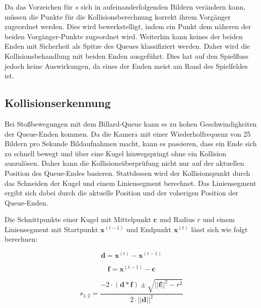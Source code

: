 Da das Vorzeichen für $s$ sich in aufeinanderfolgenden Bildern verändern kann, müssen die Punkte für die Kollisionsberechnung korrekt ihrem Vorgänger zugeordnet werden.
Dies wird bewerkstelligt, indem ein Punkt dem näheren der beiden Vorgänger-Punkte zugeordnet wird.
Weiterhin kann keines der beiden Enden mit Sicherheit als Spitze des Queues klassifiziert werden.
Daher wird die Kollisionsbehandlung mit beiden Enden ausgeführt.
Dies hat auf den Spielfluss jedoch keine Auswirkungen, da eines der Enden meist am Rand des Spielfeldes ist.

\subsection{Kollisionserkennung}

Bei Stoßbewegungen mit dem Billard-Queue kann es zu hohen Geschwindigkeiten der Queue-Enden kommen. 
Da die Kamera mit einer Wiederholfrequenz von 25 Bildern pro Sekunde Bildaufnahmen macht, kann es passieren, dass ein Ende sich zu schnell bewegt und über eine Kugel hinwegspringt ohne ein Kollision auszulösen. 
Daher kann die Kollisionsüberprüfung nicht nur auf der aktuellen Position des Queue-Endes basieren.
Stattdessen wird der Kollisionspunkt durch das Schneiden der Kugel und einem  Liniensegment berechnet. 
Das Liniensegment ergibt sich dabei durch die aktuelle Position und der voherigen Position der Queue-Enden.

Die Schnittpunkte einer Kugel mit Mittelpunkt $\textbf{c}$ und Radius $r$ und einem Liniensegment mit Startpunkt  $\textbf{x}^{(t-1)}$ und Endpunkt $\textbf{x}^{(t)}$ lässt sich wie folgt berechnen:

\hspace{-1cm}\begin{minipage}{.333333\linewidth}
	\begin{equation*}
	\textbf{d} = \textbf{x}^{(t)} - \textbf{x}^{(t-1)}
	\end{equation*}
\end{minipage}%
\begin{minipage}{.333333\linewidth}
	\begin{equation*}
	\textbf{f} = \textbf{x}^{(t-1)} - \textbf{c}
	\end{equation*}
\end{minipage}
\begin{minipage}{.333333\linewidth}
	\begin{equation*}
	s_{1,2} = \frac{-2 \cdot (\textbf{d} * \textbf{f}) \pm \sqrt{||\textbf{f}||^2 - r^2}}{2 \cdot ||\textbf{d}||^2}
	\end{equation*}
\end{minipage}
\vspace{0.3cm}

